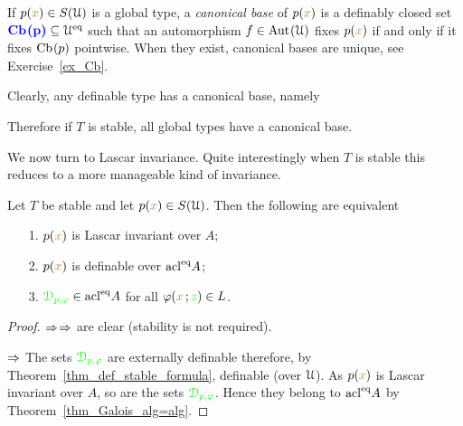 \documentclass[creche.tex]{subfiles}
\begin{document}
If $p({\color{brown} x})\in S(\EuScript U)$ is a global type, a \emph{canonical base\/} of $p({\color{brown} x})$ is a definably closed set $\textcolor{blue}{\textbf{\boldmath \textrm{Cb\kern.15ex}(p)}}\subseteq \EuScript U^{{\rm eq}}$ such that an automorphism $f\in\textrm{Aut\kern.15ex}(\EuScript U)$ fixes $p({\color{brown} x})$ if and only if it fixes $\textrm{Cb\kern.15ex}(p)$ pointwise. When they exist, canonical bases are unique, see Exercise~\ref{ex_Cb}.

Clearly, any definable type has a canonical base, namely


Therefore if $T$ is stable, all global types have a canonical base.

We now turn to Lascar invariance. Quite interestingly when $T$ is stable this reduces to a more manageable kind of invariance.

\begin{proposition}\label{prop_type_over_acl2} Let $T$ be stable and let $p({\color{brown} x})\in S(\EuScript U)$. Then the following are equivalent
\begin{itemize}
\item[1.] $p({\color{brown} x})$ is Lascar invariant over $A$;
\item[2.] $p({\color{brown} x})$ is definable over $\mathop{\rm acl}^{{\rm eq}}\!A$;
\item[3.] ${\color{green}\EuScript D_{p,\varphi}}\in \mathop{\rm acl}^{{\rm eq}}\!A$ for all $\varphi({\color{brown} x}\,;{\color{green} z})\in L$.
\end{itemize}
\end{proposition}
\begin{proof}
 $\Rightarrow$$\Rightarrow$ are clear (stability is not required).
 
 $\Rightarrow$ The sets ${\color{green}\EuScript D_{p,\varphi}}$ are externally definable therefore, by Theorem~\ref{thm_def_stable_formula}, definable (over $\EuScript U$). As $p({\color{brown} x})$ is Lascar invariant over $A$, so are the sets ${\color{green}\EuScript D_{p,\varphi}}$. Hence they belong to $\mathop{\rm acl}^{{\rm eq}}\!A$ by Theorem~\ref{thm_Galois_alg=alg}.
\end{proof}
% 
\end{document}
